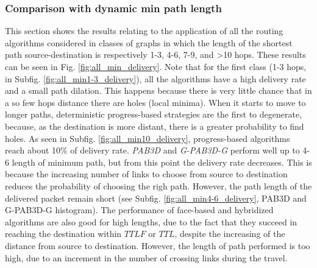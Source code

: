 \documentclass[journal,comsoc]{IEEEtran}
\begin{document}
\subsubsection{Comparison with dynamic min path length}
This section shows the results relating to the application of all the routing algorithms considered in classes of graphs in which the length of the shortest path source-destination is respectively 1-3, 4-6, 7-9, and >10 hops. These results can be seen in Fig. \ref{fig:all_min_delivery}. Note that for the first class (1-3 hops, in Subfig. \ref{fig:all_min1-3_delivery}), all the algorithms have a high delivery rate and a small path dilation. This happens because there is very little chance that in a so few hops distance there are holes (local minima).
When it starts to move to longer paths, deterministic progress-based strategies are the first to degenerate, because, as the destination is more distant, there is a greater probability to find holes. As seen in Subfig. \ref{fig:all_min10_delivery}, progress-based algorithms reach about 10\% of delivery rate.
\emph{PAB3D} and \emph{G-PAB3D-G} perform well up to 4-6 length of minimum path, but from this point the delivery rate decreases. This is because the increasing number of links to choose from source to destination reduces the probability of choosing the righ path. However, the path length of the delivered packet remain short (see Subfig. \ref{fig:all_min4-6_delivery}, PAB3D and G-PAB3D-G histogram). The performance of face-based and hybridized algorithms are also good for high lengths, due to the fact that they succeed in reaching the destination within \(TTLF\) or \(TTL\), despite the increasing of the distance from source to destination. However, the length of path performed is too high, due to an increment in the number of crossing links during the travel.
\end{document}
